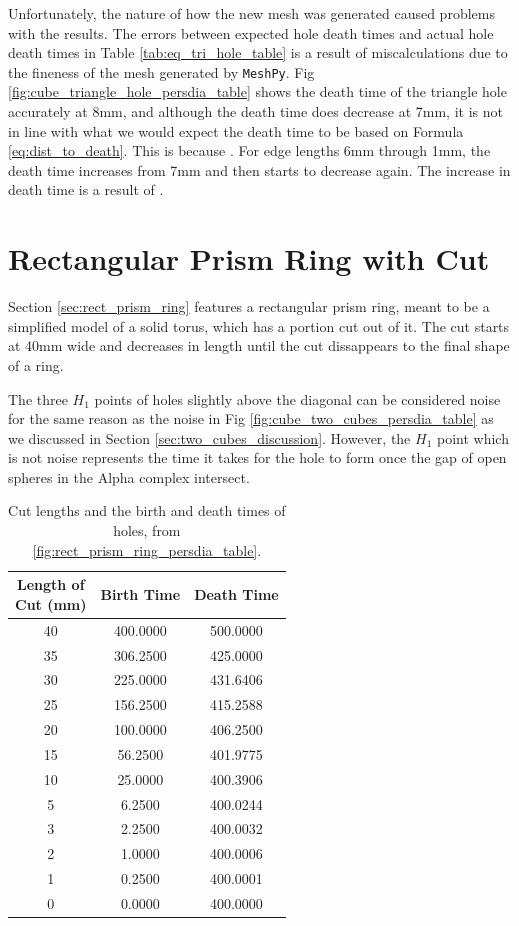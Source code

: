 \documentclass[ma]{uncgdissertationexp}
\theoremstyle{plain}
\theoremstyle{definition}
\theoremstyle{remark}
\begin{document}
\par Unfortunately, the nature of how the new mesh was generated caused problems with the results. The errors between expected hole death times and actual hole death times in Table \ref{tab:eq_tri_hole_table} is a result of miscalculations due to the fineness of the mesh generated by \verb"MeshPy". Fig \ref{fig:cube_triangle_hole_persdia_table} shows the death time of the triangle hole accurately at 8mm, and although the death time does decrease at 7mm, it is not in line with what we would expect the death time to be based on Formula \ref{eq:dist_to_death}. This is because . For edge lengths 6mm through 1mm, the death time increases from 7mm and then starts to decrease again. The increase in death time is a result of .
\newpage
\section{Rectangular Prism Ring with Cut}
\par Section \ref{sec:rect_prism_ring} features a rectangular prism ring, meant to be a simplified model of a solid torus, which has a portion cut out of it. The cut starts at 40mm wide and decreases in length until the cut dissappears to the final shape of a ring.
\par The three $H_{1}$ points of holes slightly above the diagonal can be considered noise for the same reason as the noise in Fig \ref{fig:cube_two_cubes_persdia_table} as we discussed in Section \ref{sec:two_cubes_discussion}. However, the $H_{1}$ point which is not noise represents the time it takes for the hole to form once the gap of open spheres in the Alpha complex intersect.
\begin{table}[H]
\centering
\begin{tabular}{|c|c|c|}
    \hline
    \makecell{Length of\\Cut (mm)} & Birth Time & Death Time \\
    \hline
    40 & 400.0000 & 500.0000 \\
    35 & 306.2500 & 425.0000 \\
    30 & 225.0000 & 431.6406 \\
    25 & 156.2500 & 415.2588 \\
    20 & 100.0000 & 406.2500 \\
    15 & 56.2500 & 401.9775 \\
    10 & 25.0000 & 400.3906 \\
    5 & 6.2500 & 400.0244 \\
    3 & 2.2500 & 400.0032 \\
    2 & 1.0000 & 400.0006 \\
    1 & 0.2500 & 400.0001 \\
    0 & 0.0000 & 400.0000 \\
    \hline
\end{tabular}
\caption{Cut lengths and the birth and death times of holes, from \ref{fig:rect_prism_ring_persdia_table}.}
\end{table}
\end{document}
